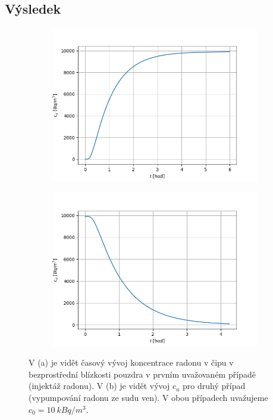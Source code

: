 \documentclass[11pt,a4paper]{article}
\begin{document}
\subsection{Výsledek}
\begin{figure}[t!]
	\centering
	\begin{subfigure}{.7\textwidth}
		\includegraphics[width=\linewidth]{narust}
		\caption{}
		\label{fig:narust}
	\end{subfigure}
	\begin{subfigure}{.7\textwidth}
		\includegraphics[width=\linewidth]{pokles}
		\caption{}
		\label{fig:pokles}
	\end{subfigure}
\caption{V (a) je vidět časový vývoj koncentrace radonu v čipu v bezprostřední blízkosti pouzdra v prvním uvažovaném případě (injektáž radonu). V (b) je vidět vývoj $c_u$ pro druhý případ (vypumpování radonu ze sudu ven). V obou případech uvažujeme $c_0=\SI{10}{kBq/m^3}$.}
\label{fig:vyvoj_uvnitr}
\end{figure}
\end{document}
